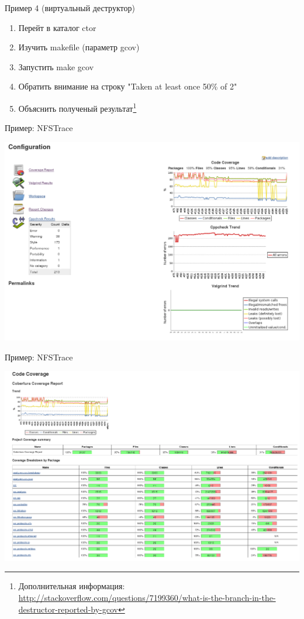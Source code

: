 \begin{frame}{Пример 4 (виртуальный деструктор)}
  \begin{enumerate}
      \item Перейт в каталог ctor
      \item Изучить makefile (параметр gcov)
      \item Запустить make gcov
      \item Обратить внимание на строку "Taken at least once 50\% of 2"
      \item Объяснить полученый результат\footnote{Дополнительная информация: \url{http://stackoverflow.com/questions/7199360/what-is-the-branch-in-the-destructor-reported-by-gcov}}
  \end{enumerate}

\end{frame}

\begin{frame}{Пример: NFSTrace}
  \begin{center}
    \includegraphics[height=0.9\textheight]{../../slides/profile/nfs-trace-coverage.png}
  \end{center}
\end{frame}

\begin{frame}{Пример: NFSTrace}
  \begin{center}
    \includegraphics[height=0.9\textheight]{../../slides/profile/nfs-trace-coverage-html.png}
  \end{center}
\end{frame}

